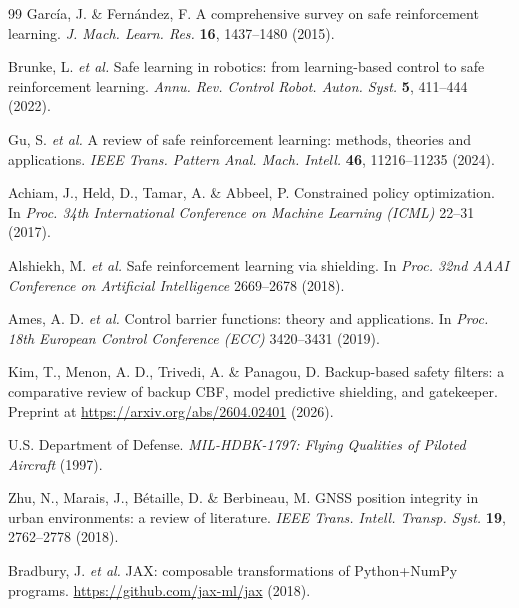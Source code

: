 \begin{thebibliography}{99}
 Garc\'ia, J. \& Fern\'andez, F. A comprehensive survey on safe reinforcement learning. \textit{J. Mach. Learn. Res.} \textbf{16}, 1437--1480 (2015).

 Brunke, L. \textit{et al.} Safe learning in robotics: from learning-based control to safe reinforcement learning. \textit{Annu. Rev. Control Robot. Auton. Syst.} \textbf{5}, 411--444 (2022).

 Gu, S. \textit{et al.} A review of safe reinforcement learning: methods, theories and applications. \textit{IEEE Trans. Pattern Anal. Mach. Intell.} \textbf{46}, 11216--11235 (2024).

 Achiam, J., Held, D., Tamar, A. \& Abbeel, P. Constrained policy optimization. In \textit{Proc. 34th International Conference on Machine Learning (ICML)} 22--31 (2017).

 Alshiekh, M. \textit{et al.} Safe reinforcement learning via shielding. In \textit{Proc. 32nd AAAI Conference on Artificial Intelligence} 2669--2678 (2018).

 Ames, A. D. \textit{et al.} Control barrier functions: theory and applications. In \textit{Proc. 18th European Control Conference (ECC)} 3420--3431 (2019).

 Kim, T., Menon, A. D., Trivedi, A. \& Panagou, D. Backup-based safety filters: a comparative review of backup CBF, model predictive shielding, and gatekeeper. Preprint at \url{https://arxiv.org/abs/2604.02401} (2026).

 U.S. Department of Defense. \textit{MIL-HDBK-1797: Flying Qualities of Piloted Aircraft} (1997).

 Zhu, N., Marais, J., B\'etaille, D. \& Berbineau, M. GNSS position integrity in urban environments: a review of literature. \textit{IEEE Trans. Intell. Transp. Syst.} \textbf{19}, 2762--2778 (2018).

 Bradbury, J. \textit{et al.} JAX: composable transformations of Python+NumPy programs. \url{https://github.com/jax-ml/jax} (2018).

\end{thebibliography}
